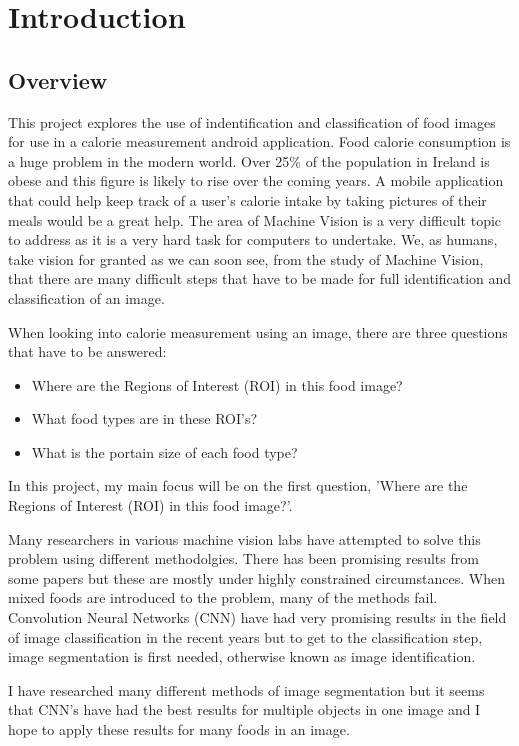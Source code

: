 \chapter{Introduction}
\label{intro}

\section{Overview}
This project explores the use of indentification and classification of food images for use in a calorie measurement android application.
Food calorie consumption is a huge problem in the modern world.
Over 25\% of the population in Ireland is obese and this figure is likely to rise over the coming years.
A mobile application that could help keep track of a user's calorie intake by taking pictures of their meals would be a great help.
The area of Machine Vision is a very difficult topic to address as it is a very hard task for computers to undertake.
We, as humans, take vision for granted as we can soon see, from the study of Machine Vision, that there are many difficult steps that have to be made for full identification and classification of an image.

When looking into calorie measurement using an image, there are three questions that have to be answered:
\begin{itemize}
\item{Where are the Regions of Interest (ROI) in this food image?}
\item{What food types are in these ROI's?}
\item{What is the portain size of each food type?}
\end{itemize}
In this project, my main focus will be on the first question, 'Where are the Regions of Interest (ROI) in this food image?'.

Many researchers in various machine vision labs have attempted to solve this problem using different methodolgies.
There has been promising results from some papers but these are mostly under highly constrained circumstances.
When mixed foods are introduced to the problem, many of the methods fail.
Convolution Neural Networks (CNN) have had very promising results in the field of image classification in the recent years but to get to the classification step, image segmentation is first needed, otherwise known as image identification.

I have researched many different methods of image segmentation but it seems that CNN's have had the best results for multiple objects in one image and I hope to apply these results for many foods in an image.

